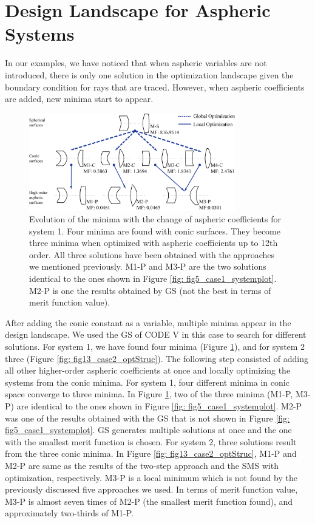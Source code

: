 \section{Design Landscape for Aspheric Systems}
In our examples, we have noticed that when aspheric variables are not introduced, there is only one solution in the optimization landscape given the boundary condition for rays that are traced. However, when aspheric coefficients are added, new minima start to appear. 

\begin{figure}[h!]
    \centering
    \includegraphics[width=0.8\textwidth]{chapter-5/figures/Fig12_System1_structure.png}
    \caption{Evolution of the minima with the change of aspheric coefficients for system 1. Four minima are found with conic surfaces. They become three minima when optimized with aspheric coefficients up to 12th order. All three solutions have been obtained with the approaches we mentioned previously. M1-P and M3-P are the two solutions identical to the ones shown in Figure \ref{fig: fig5_case1_systemplot}. M2-P is one the results obtained by GS (not the best in terms of merit function value). }
    \label{fig: fig12_case1_optStruc}
\end{figure}

After adding the conic constant as a variable, multiple minima appear in the design landscape. We used the GS of CODE V in this case to search for different solutions. For system 1, we have found four minima (Figure \ref{fig: fig12_case1_optStruc}), and for system 2 three (Figure \ref{fig: fig13_case2_optStruc}). 
The following step consisted of adding all other higher-order aspheric coefficients at once and locally optimizing the systems from the conic minima. For system 1, four different minima in conic space converge to three minima. In Figure \ref{fig: fig12_case1_optStruc}, two of the three minima (M1-P, M3-P) are identical to the ones shown in Figure \ref{fig: fig5_case1_systemplot}. M2-P was one of the results obtained with the GS that is not shown in Figure \ref{fig: fig5_case1_systemplot}. GS generates multiple solutions at once and the one with the smallest merit function is chosen. For system 2, three solutions result from the three conic minima. In Figure \ref{fig: fig13_case2_optStruc}, M1-P and M2-P are same as the results of the two-step approach and the SMS with optimization, respectively. M3-P is a local minimum which is not found by the previously discussed five approaches we used. In terms of merit function value, M3-P is almost seven times of M2-P (the smallest merit function found), and approximately two-thirds of M1-P.

